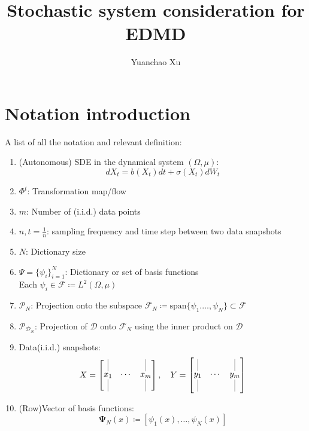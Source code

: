 \documentclass{article}[11]
\title{Stochastic system consideration for EDMD}
\author{Yuanchao Xu}
\begin{document}
\maketitle

\section{Notation introduction}
A list of all the notation and relevant definition:
\begin{enumerate}
	\item (Autonomous) SDE in the dynamical system $(\Omega, \mu)$:
	$$dX_t = b(X_t)dt + \sigma(X_t)dW_t$$
	
	\item $\Phi^{t}$: Transformation map/flow
	
	\item $m$: Number of (i.i.d.) data points
	
	\item $n,t=\frac{1}{n}$: sampling frequency and time step between two data snapshots
	
	\item $N$: Dictionary size
	
	\item $\Psi = \{\psi_i\}_{i=1}^N$: Dictionary or set of basis functions \\
	Each $\psi_i \in \mathcal{F}\coloneqq L^2(\Omega, \mu)$
	
	\item $\mathcal{P}_{N}$: Projection onto the subspace $\mathcal{F}_N \coloneqq \text{span}\{\psi_1. \dots, \psi_N\}\subset\mathcal{F}$
	
	\item $\mathcal{P}_{\mathcal{D}_N}$: Projection of $\mathcal{D}$ onto $\mathcal{F}_N$ using the inner product on $\mathcal{D}$
	
	\item Data(i.i.d.) snapshots:
	\[
	X = \begin{bmatrix} 
		\underset{\rule{0.1mm}{5mm}}{\overset{\rule{0.1mm}{5mm}}{x_1}} & \cdots & \underset{\rule{0.1mm}{5mm}}{\overset{\rule{0.1mm}{5mm}}{x_m}}
	\end{bmatrix}
	, \quad
	Y = \begin{bmatrix} 
		\underset{\rule{0.1mm}{5mm}}{\overset{\rule{0.1mm}{5mm}}{y_1}} & \cdots & \underset{\rule{0.1mm}{5mm}}{\overset{\rule{0.1mm}{5mm}}{y_m}}
	\end{bmatrix}
	\]	
	
	\item (Row)Vector of basis functions:
	$$
	\mathbf{\Psi}_N(x) \coloneqq \left[\psi_1(x), \dots, \psi_N(x)\right]
	$$
	

\end{enumerate}
\end{document}
